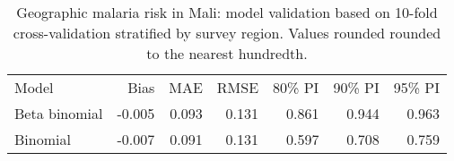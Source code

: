 \begin{table}[!t]

	\begin{tabularx}{\textwidth}{Xrrrrrr}

	Model & Bias & MAE & RMSE & 80\% PI & 90\% PI & 95\% PI \\ \arrayrulecolor{black!30}\midrule

	Beta binomial & -0.005 & 0.093 & 0.131 & 0.861 & 0.944 & 0.963 \\ 
	Binomial & -0.007 & 0.091 & 0.131 & 0.597 & 0.708 & 0.759 \\ 
	
	\end{tabularx}
	
	\caption{Geographic malaria risk in Mali: model validation based on 10-fold cross-validation stratified by survey region. Values rounded rounded to the nearest hundredth.}
	\label{tab:mali_modelvalidation}
	
\end{table}